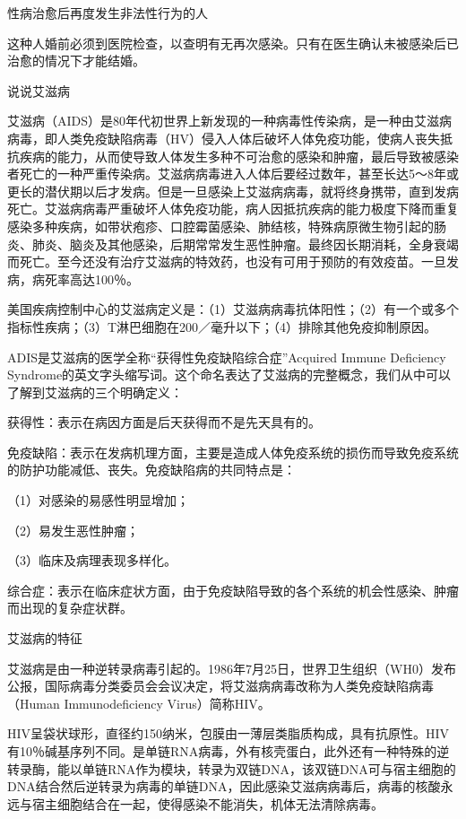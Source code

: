 \documentclass[12pt,UTF8]{ctexbook}
\begin{document}
性病治愈后再度发生非法性行为的人

这种人婚前必须到医院检查，以查明有无再次感染。只有在医生确认未被感染后已治愈的情况下才能结婚。





说说艾滋病


艾滋病（AIDS）是80年代初世界上新发现的一种病毒性传染病，是一种由艾滋病病毒，即人类免疫缺陷病毒（HV）侵入人体后破坏人体免疫功能，使病人丧失抵抗疾病的能力，从而使导致人体发生多种不可治愈的感染和肿瘤，最后导致被感染者死亡的一种严重传染病。艾滋病病毒进入人体后要经过数年，甚至长达5～8年或更长的潜伏期以后才发病。但是一旦感染上艾滋病病毒，就将终身携带，直到发病死亡。艾滋病病毒严重破坏人体免疫功能，病人因抵抗疾病的能力极度下降而重复感染多种疾病，如带状疱疹、口腔霉菌感染、肺结核，特殊病原微生物引起的肠炎、肺炎、脑炎及其他感染，后期常常发生恶性肿瘤。最终因长期消耗，全身衰竭而死亡。至今还没有治疗艾滋病的特效药，也没有可用于预防的有效疫苗。一旦发病，病死率高达100％。

美国疾病控制中心的艾滋病定义是：（1）艾滋病病毒抗体阳性；（2）有一个或多个指标性疾病；（3）T淋巴细胞在200／毫升以下；（4）排除其他免疫抑制原因。

ADIS是艾滋病的医学全称“获得性免疫缺陷综合症”Acquired Immune Deficiency Syndrome的英文字头缩写词。这个命名表达了艾滋病的完整概念，我们从中可以了解到艾滋病的三个明确定义：

获得性：表示在病因方面是后天获得而不是先天具有的。

免疫缺陷：表示在发病机理方面，主要是造成人体免疫系统的损伤而导致免疫系统的防护功能减低、丧失。免疫缺陷病的共同特点是：

（1）对感染的易感性明显增加；

（2）易发生恶性肿瘤；

（3）临床及病理表现多样化。

综合症：表示在临床症状方面，由于免疫缺陷导致的各个系统的机会性感染、肿瘤而出现的复杂症状群。





艾滋病的特征


艾滋病是由一种逆转录病毒引起的。1986年7月25日，世界卫生组织（WH0）发布公报，国际病毒分类委员会会议决定，将艾滋病病毒改称为人类免疫缺陷病毒（Human Immunodeficiency Virus）简称HIV。

HIV呈袋状球形，直径约150纳米，包膜由一薄层类脂质构成，具有抗原性。HIV有10％碱基序列不同。是单链RNA病毒，外有核壳蛋白，此外还有一种特殊的逆转录酶，能以单链RNA作为模块，转录为双链DNA，该双链DNA可与宿主细胞的DNA结合然后逆转录为病毒的单链DNA，因此感染艾滋病病毒后，病毒的核酸永远与宿主细胞结合在一起，使得感染不能消失，机体无法清除病毒。
\end{document}
